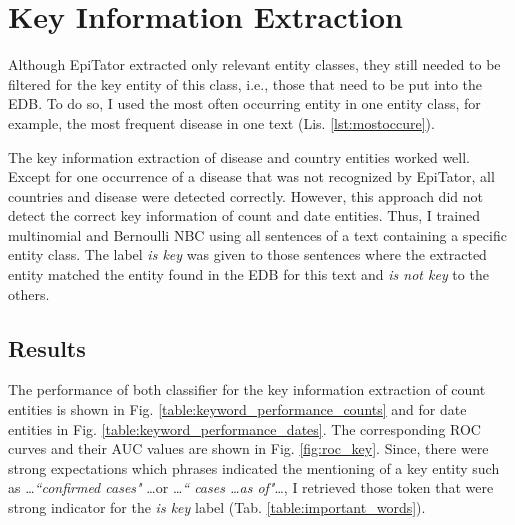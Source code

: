 \section{Key Information Extraction}
  Although EpiTator extracted only relevant entity classes, they still needed to be filtered for the key entity of this class, i.e., those that need to be put into the EDB.
  To do so, I used the most often occurring entity in one entity class, for example, the most frequent disease in one text (Lis. \ref{lst:mostoccure}).

  The key information extraction of disease and country entities worked well.
  Except for one occurrence of a disease that was not recognized by EpiTator, all countries and disease were detected correctly.
  However, this approach did not detect the correct key information of count and date entities.
  Thus, I trained multinomial and Bernoulli NBC using all sentences of a text containing a specific entity class.
  The label \textsl{is key} was given to those sentences where the extracted entity matched the entity found in the EDB for this text and \textsl{is not key} to the others.

\subsection{Results}
  The performance of both classifier for the key information extraction of count entities is shown in Fig. \ref{table:keyword_performance_counts} and for date entities in Fig. \ref{table:keyword_performance_dates}. The corresponding ROC curves and their AUC values are shown in Fig. \ref{fig:roc_key}. Since, there were strong expectations which phrases indicated the mentioning of a key entity such as \dots \textit{``confirmed cases"} \dots or \dots \textit{`` cases \dots as of"}\dots, I retrieved those token that were strong indicator for the \textsl{is key} label (Tab. \ref{table:important_words}).

